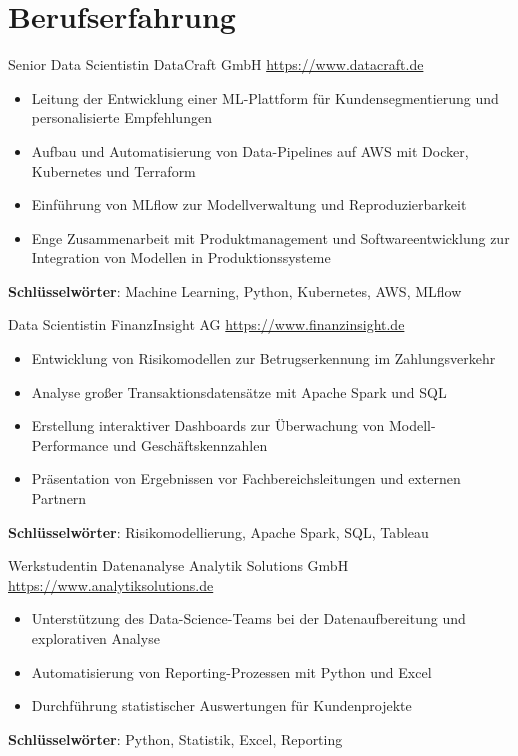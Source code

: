 \documentclass[a4paper, serif, 10pt]{moderncv}
\begin{document}
\section{Berufserfahrung}

        {Senior Data Scientistin}
        {DataCraft GmbH}
        {\url{https://www.datacraft.de}}
        {}
        {\begin{itemize}
\item Leitung der Entwicklung einer ML-Plattform für Kundensegmentierung und personalisierte Empfehlungen
\item Aufbau und Automatisierung von Data-Pipelines auf AWS mit Docker, Kubernetes und Terraform
\item Einführung von MLflow zur Modellverwaltung und Reproduzierbarkeit
\item Enge Zusammenarbeit mit Produktmanagement und Softwareentwicklung zur Integration von Modellen in Produktionssysteme
\end{itemize}
\textbf{Schlüsselwörter}: Machine Learning, Python, Kubernetes, AWS, MLflow}

        {Data Scientistin}
        {FinanzInsight AG}
        {\url{https://www.finanzinsight.de}}
        {}
        {\begin{itemize}
\item Entwicklung von Risikomodellen zur Betrugserkennung im Zahlungsverkehr
\item Analyse großer Transaktionsdatensätze mit Apache Spark und SQL
\item Erstellung interaktiver Dashboards zur Überwachung von Modell-Performance und Geschäftskennzahlen
\item Präsentation von Ergebnissen vor Fachbereichsleitungen und externen Partnern
\end{itemize}
\textbf{Schlüsselwörter}: Risikomodellierung, Apache Spark, SQL, Tableau}

        {Werkstudentin Datenanalyse}
        {Analytik Solutions GmbH}
        {\url{https://www.analytiksolutions.de}}
        {}
        {\begin{itemize}
\item Unterstützung des Data-Science-Teams bei der Datenaufbereitung und explorativen Analyse
\item Automatisierung von Reporting-Prozessen mit Python und Excel
\item Durchführung statistischer Auswertungen für Kundenprojekte
\end{itemize}
\textbf{Schlüsselwörter}: Python, Statistik, Excel, Reporting}
\end{document}
